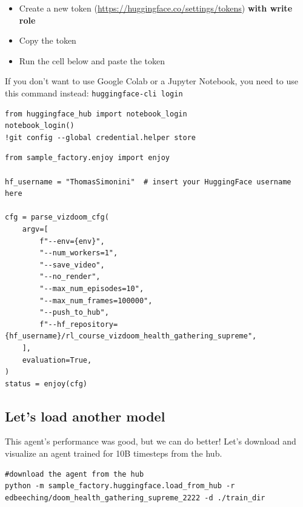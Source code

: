 \documentclass[11pt,a4paper]{article}
\begin{document}
\begin{itemize}
\tightlist
\item
  Create a new token (\url{https://huggingface.co/settings/tokens}) \textbf{with write role}
\end{itemize}


\begin{itemize}
\tightlist
\item
  Copy the token
\item
  Run the cell below and paste the token
\end{itemize}

If you don't want to use Google Colab or a Jupyter Notebook, you need to use this command instead: \texttt{huggingface-cli\ login}

\begin{lstlisting}
from huggingface_hub import notebook_login
notebook_login()
!git config --global credential.helper store
\end{lstlisting}

\begin{lstlisting}
from sample_factory.enjoy import enjoy

hf_username = "ThomasSimonini"  # insert your HuggingFace username here

cfg = parse_vizdoom_cfg(
    argv=[
        f"--env={env}",
        "--num_workers=1",
        "--save_video",
        "--no_render",
        "--max_num_episodes=10",
        "--max_num_frames=100000",
        "--push_to_hub",
        f"--hf_repository={hf_username}/rl_course_vizdoom_health_gathering_supreme",
    ],
    evaluation=True,
)
status = enjoy(cfg)
\end{lstlisting}

\subsection{Let's load another model}\label{lets-load-another-model}

This agent's performance was good, but we can do better! Let's download and visualize an agent trained for 10B timesteps from the hub.

\begin{lstlisting}
#download the agent from the hub
python -m sample_factory.huggingface.load_from_hub -r edbeeching/doom_health_gathering_supreme_2222 -d ./train_dir
\end{lstlisting}
\end{document}
